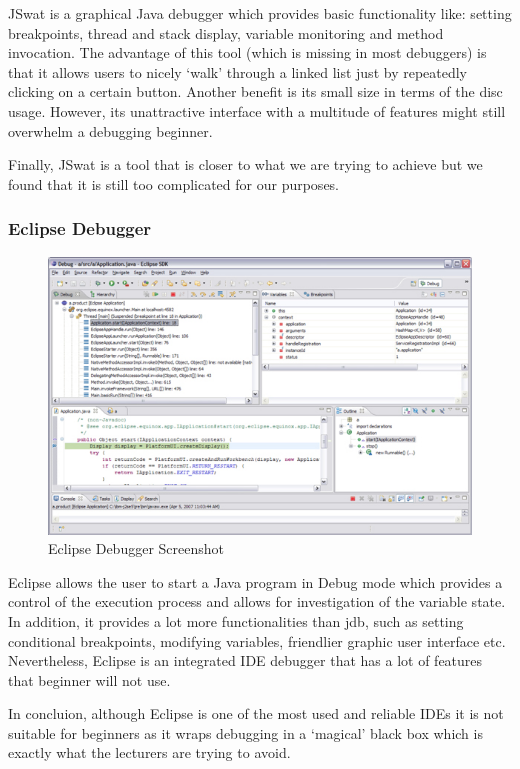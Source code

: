 \documentclass[11pt, a4paper]{article}
\begin{document}
JSwat is a graphical Java debugger which provides basic functionality like: setting breakpoints, thread and stack display, variable monitoring and method invocation.
The advantage of this tool (which is missing in most debuggers) is that it allows users to nicely `walk' through a linked list just by repeatedly clicking on a certain button.
Another benefit is its small size in terms of the disc usage.
However, its unattractive interface with a multitude of features might still overwhelm a debugging beginner.

Finally, JSwat is a tool that is closer to what we are trying to achieve but we found that it is still too complicated for our purposes. 

\subsubsection{Eclipse Debugger}
\begin{figure}[h!]
\centering
\includegraphics[width=125mm]{eclipse.jpg}
\caption{Eclipse Debugger Screenshot}
\end{figure}

Eclipse allows the user to start a Java program in Debug mode which provides a control of the execution process and allows for investigation of the variable state.
In addition, it provides a lot more functionalities than jdb, such as setting conditional breakpoints, modifying variables, friendlier graphic user interface etc.
Nevertheless, Eclipse is an integrated IDE debugger that has a lot of features that beginner will not use.

In concluion, although Eclipse is one of the most used and reliable IDEs it is not suitable for beginners as it wraps debugging in a `magical' black box which is exactly what the lecturers are trying to avoid. 
\end{document}
